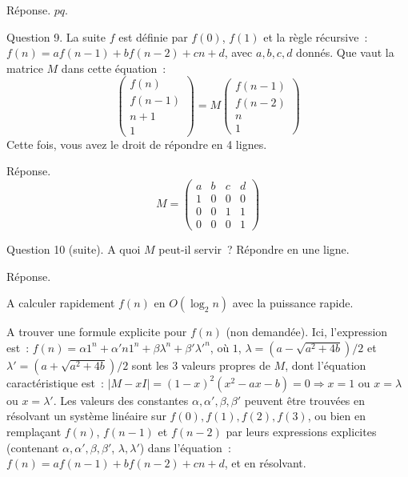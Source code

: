 \documentclass[a4paper,12pt]{article}
\begin{document}
Réponse.  $pq$.

Question 9. La suite $f$ est définie par $f(0)$, $f(1)$ et la règle récursive~:
$f(n)=a f(n-1) + b f(n-2) + cn + d$, avec $a, b, c, d$ donnés.
Que vaut la matrice $M$ dans cette équation~:
$$ \left(\begin{array}{l} f(n) \\
f(n-1) \\
n+1 \\
1
\end{array}\right)= M \left(\begin{array}{l} f(n-1)  \\
f(n-2) \\
n \\
1
\end{array}\right)$$ 
Cette fois, vous avez le droit de répondre en 4 lignes.

Réponse. $$M= \left(\begin{array}{llll}
a & b & c & d \\
1 & 0 & 0 & 0 \\
0 & 0 & 1 & 1 \\
0 & 0 & 0 & 1 
\end{array}\right)$$


Question 10 (suite). A quoi $M$ peut-il servir~?  Répondre en une ligne.

Réponse. 

A calculer rapidement  $f(n)$ en $O(\log_2 n)$ avec la puissance rapide. 

A trouver une formule explicite pour $f(n)$ (non demandée). Ici, 
l'expression est~: $f(n)= \alpha 1^n +  \alpha' n 1^n + \beta \lambda^n + \beta' \lambda'^n$, où 
$1$, $\lambda= (a- \sqrt{a^2+4b})/2$ et $\lambda'=(a+ \sqrt{a^2+4b})/2$
sont les 3 valeurs propres de $M$, dont 
l'équation  caractéristique 
est~: $|M-x I|=(1-x)^2(x^2-ax-b)=0\Rightarrow x=1$ ou $x=\lambda$ ou $ x=\lambda'$. 
Les valeurs des constantes $\alpha, \alpha', \beta, \beta'$ peuvent être trouvées en
résolvant un système linéaire sur $f(0), f(1), f(2), f(3)$, ou bien
en remplaçant $f(n)$, $f(n-1)$ et $f(n-2)$ par leurs expressions explicites (contenant $\alpha, \alpha', \beta, \beta'$, $\lambda, \lambda'$) dans l'équation~: 
$f(n)=a f(n-1) + b f(n-2) + cn + d$, et en résolvant.
\end{document}
